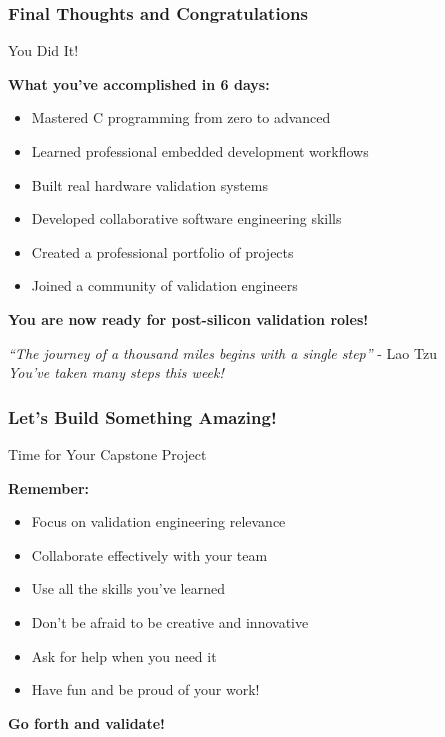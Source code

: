 \documentclass{beamer}
\begin{document}
\begin{frame}
\frametitle{Final Thoughts and Congratulations}
\begin{center}
\Large You Did It!
\end{center}

\textbf{What you've accomplished in 6 days:}
\begin{itemize}
    \item Mastered C programming from zero to advanced
    \item Learned professional embedded development workflows
    \item Built real hardware validation systems
    \item Developed collaborative software engineering skills
    \item Created a professional portfolio of projects
    \item Joined a community of validation engineers
\end{itemize}

\vspace{0.5cm}
\begin{center}
\textbf{You are now ready for post-silicon validation roles!}
\end{center}

\vspace{0.5cm}
\begin{center}
\textit{``The journey of a thousand miles begins with a single step''} - Lao Tzu\\
\textit{You've taken many steps this week!}
\end{center}
\end{frame}

\begin{frame}
\frametitle{Let's Build Something Amazing!}
\begin{center}
\Large Time for Your Capstone Project
\end{center}

\textbf{Remember:}
\begin{itemize}
    \item Focus on validation engineering relevance
    \item Collaborate effectively with your team
    \item Use all the skills you've learned
    \item Don't be afraid to be creative and innovative
    \item Ask for help when you need it
    \item Have fun and be proud of your work!
\end{itemize}

\vspace{1cm}
\begin{center}
\textbf{Go forth and validate!}
\end{center}
\end{frame}
\end{document}
